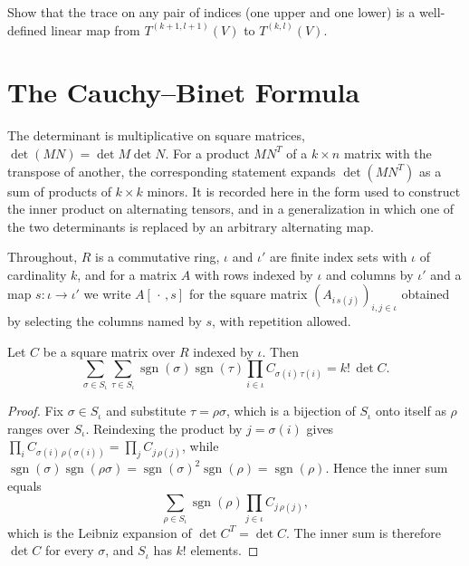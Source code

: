\begin{exercise}
\label{exer:trace-well-defined}
Show that the trace on any pair of indices (one upper and one lower) is a well-defined linear map from $T^{(k+1,l+1)}(V)$ to $T^{(k,l)}(V)$.
\end{exercise}

\section{The Cauchy--Binet Formula}

The determinant is multiplicative on square matrices, $\det(MN) = \det M \det N$. For a product $MN^{T}$ of a $k \times n$ matrix with the transpose of another, the corresponding statement expands $\det(MN^{T})$ as a sum of products of $k \times k$ minors. It is recorded here in the form used to construct the inner product on alternating tensors, and in a generalization in which one of the two determinants is replaced by an arbitrary alternating map.

Throughout, $R$ is a commutative ring, $\iota$ and $\iota'$ are finite index sets with $\iota$ of cardinality $k$, and for a matrix $A$ with rows indexed by $\iota$ and columns by $\iota'$ and a map $s \colon \iota \to \iota'$ we write $A[\,\cdot\,, s]$ for the square matrix $(A_{i\,s(j)})_{i,j \in \iota}$ obtained by selecting the columns named by $s$, with repetition allowed.

\begin{lemma}
\label{lem:sum-sign-prod-det}
\leanok
Let $C$ be a square matrix over $R$ indexed by $\iota$. Then
\[
\sum_{\sigma \in S_\iota} \sum_{\tau \in S_\iota} \operatorname{sgn}(\sigma)\operatorname{sgn}(\tau) \prod_{i \in \iota} C_{\sigma(i)\,\tau(i)} = k!\,\det C .
\]
\end{lemma}
\begin{proof}
\leanok
Fix $\sigma \in S_\iota$ and substitute $\tau = \rho\sigma$, which is a bijection of $S_\iota$ onto itself as $\rho$ ranges over $S_\iota$. Reindexing the product by $j = \sigma(i)$ gives $\prod_{i} C_{\sigma(i)\,\rho(\sigma(i))} = \prod_{j} C_{j\,\rho(j)}$, while $\operatorname{sgn}(\sigma)\operatorname{sgn}(\rho\sigma) = \operatorname{sgn}(\sigma)^2\operatorname{sgn}(\rho) = \operatorname{sgn}(\rho)$. Hence the inner sum equals
\[
\sum_{\rho \in S_\iota} \operatorname{sgn}(\rho) \prod_{j \in \iota} C_{j\,\rho(j)},
\]
which is the Leibniz expansion of $\det C^{T} = \det C$. The inner sum is therefore $\det C$ for every $\sigma$, and $S_\iota$ has $k!$ elements.
\end{proof}

